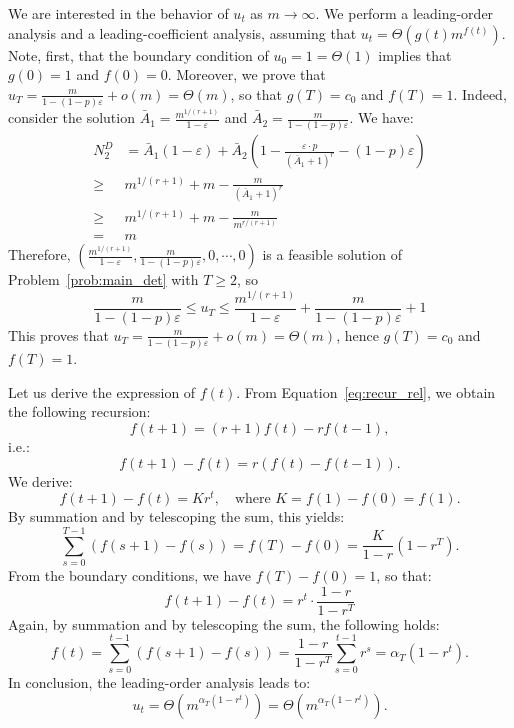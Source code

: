 \documentclass[nonblindrev]{informs3noheader}
\begin{document}
We are interested in the behavior of $u_t$ as $m \to \infty$. We perform a leading-order analysis and a leading-coefficient analysis, assuming that $u_t = \Theta(g(t)m^{f(t)})$. Note, first, that the boundary condition of $u_0=1=\Theta(1)$ implies that $g(0)=1$ and $f(0)=0$. Moreover, we prove that $u_T = \frac{m}{1-(1-p)\varepsilon} + o(m)=\Theta(m)$, so that $g(T)=c_0$ and $f(T)=1$. Indeed, consider the solution $\bar A_1=\frac{m^{1/(r+1)}}{1-\varepsilon}$ and $\bar A_2=\frac{m}{1-(1-p)\varepsilon} $. We have:
\begin{align*}
    N^D_2 &=  \bar A_1(1-\varepsilon)+\bar A_2\left(1-\frac{\varepsilon\cdot p}{(\bar A_1+1)^{r}}-(1-p)\varepsilon\right)\\
    \geq& m^{1/(r+1)} + m - \frac{m}{(\bar A_1+1)^{r}}\\
    \geq& m^{1/(r+1)}+m-\frac{m}{m^{r/(r+1)}}\\
    =& m
\end{align*}
Therefore, $\left(\frac{m^{1/(r+1)}}{1-\varepsilon},\frac{m}{1-(1-p)\varepsilon},0,\cdots,0\right)$ is a feasible solution of Problem~\eqref{prob:main_det} with $T\geq2$, so
$$\frac{m}{1-(1-p)\varepsilon}\leq u_T\leq \frac{m^{1/(r+1)}}{1-\varepsilon}+\frac{m}{1-(1-p)\varepsilon}+1$$
This proves that $u_T = \frac{m}{1-(1-p)\varepsilon} + o(m)=\Theta(m)$, hence $g(T)=c_0$ and $f(T)=1$.


Let us derive the expression of $f(t)$. From Equation~\eqref{eq:recur_rel}, we obtain the following recursion:
\[f(t+1) = (r+1)f(t)-rf(t-1),\]
i.e.:
\[f(t+1)-f(t) = r\left(f(t)-f(t-1)\right).\]
We derive:
$$f(t+1)-f(t)=Kr^t,\quad\text{where $K=f(1)-f(0)=f(1)$.}$$
By summation and by telescoping the sum, this yields:
$$\sum_{s=0}^{T-1}(f(s+1)-f(s))=f(T)-f(0)=\frac{K}{1-r}\left(1-r^T\right).$$
From the boundary conditions, we have $f(T)-f(0)=1$, so that:
$$f(t+1)-f(t)=r^{t}\cdot\frac{1-r}{1-r^T}$$
Again, by summation and by telescoping the sum, the following holds:
$$f(t)=\sum_{s=0}^{t-1}(f(s+1)-f(s))=\frac{1-r}{1-r^T}\sum_{s=0}^{t-1}r^s=\alpha_T(1-r^t).$$
In conclusion, the leading-order analysis leads to:
$$u_t=\Theta\left(m^{\alpha_T(1-r^t)}\right)=\Theta\left(m^{\alpha_T\left(1-r^t\right)}\right).$$
\end{document}

